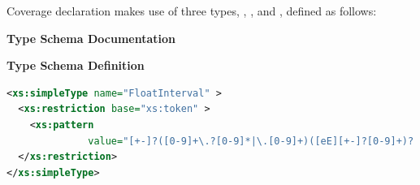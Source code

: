\documentclass[11pt,a4paper]{ivoa}
\begin{document}


Coverage declaration makes use of three types, ,
, and , defined as
follows:


\begin{generated}
\begingroup
      	\renewcommand*\descriptionlabel[1]{%
      	\hbox to 5.5em{\emph{#1}\hfil}}\vspace{2ex}\noindent\textbf{ Type Schema Documentation}



\vspace{1ex}\noindent\textbf{ Type Schema Definition}

\begin{lstlisting}[language=XML,basicstyle=\footnotesize]
<xs:simpleType name="FloatInterval" >
  <xs:restriction base="xs:token" >
    <xs:pattern
              value="[+-]?([0-9]+\.?[0-9]*|\.[0-9]+)([eE][+-]?[0-9]+)? [+-]?([0-9]+\.?[0-9]*|\.[0-9]+)([eE][+-]?[0-9]+)?" />
  </xs:restriction>
</xs:simpleType>
\end{lstlisting}\endgroup
\end{generated}

\end{document}
